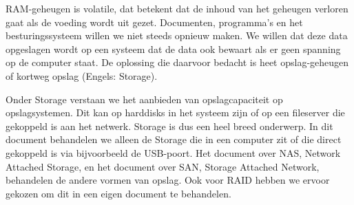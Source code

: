 RAM-geheugen is volatile, dat betekent dat de inhoud van het geheugen verloren gaat als de voeding wordt uit gezet. Documenten, programma's en het besturingssysteem willen we niet steeds opnieuw maken. We willen dat deze data opgeslagen wordt op een systeem dat de data ook bewaart als er geen spanning op de computer staat. De oplossing die daarvoor bedacht is heet opslag-geheugen of kortweg opslag (Engels: Storage).

Onder Storage verstaan we het aanbieden van opslagcapaciteit op opslagsystemen. Dit kan op harddisks in het systeem zijn of op een fileserver die gekoppeld is aan het netwerk. Storage is dus een heel breed onderwerp. In dit document behandelen we alleen de Storage die in een computer zit of die direct gekoppeld is via bijvoorbeeld de USB-poort. Het document over NAS, Network Attached Storage, en het document over SAN, Storage Attached Network, behandelen de andere vormen van opslag. Ook voor RAID hebben we ervoor gekozen om dit in een eigen document te behandelen.

